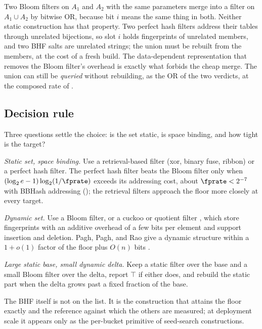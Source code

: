 \begin{remark}
\label{rem:bhf-nonmergeable}
Two Bloom filters on $A_1$ and $A_2$ with the same parameters merge into a
filter on $A_1 \cup A_2$ by bitwise OR, because bit $i$ means the same
thing in both. Neither static construction has that property. Two perfect
hash filters address their tables through unrelated bijections, so slot
$i$ holds fingerprints of unrelated members, and two BHF salts are
unrelated strings; the union must be rebuilt from the members, at the
cost of a fresh build. The data-dependent representation that removes
the Bloom filter's overhead is exactly what forbids the cheap merge. The
union can still be \emph{queried} without rebuilding, as the OR of the
two verdicts, at the composed rate of .
\end{remark}

\subsection*{Decision rule}

Three questions settle the choice: is the set static, is space binding,
and how tight is the target?

\smallskip
\noindent\emph{Static set, space binding.} Use a retrieval-based filter
(xor, binary fuse, ribbon) or a perfect hash filter. The perfect hash
filter beats the Bloom filter only when $(\log_2 e - 1) \log_2(1/\fprate)$
exceeds its addressing cost, about $\fprate < 2^{-7}$ with BBHash
addressing (); the retrieval filters approach the
floor more closely at every target.

\smallskip
\noindent\emph{Dynamic set.} Use a Bloom filter, or a cuckoo or quotient
filter \parencite{fan-cuckoo-2014,bender-quotient-2012}, which store
fingerprints with an additive overhead of a few bits per element and
support insertion and deletion. Pagh, Pagh, and Rao give a dynamic
structure within a $1 + o(1)$ factor of the floor plus $O(n)$ bits
\parencite{pagh-pagh-rao-2005}.

\smallskip
\noindent\emph{Large static base, small dynamic delta.} Keep a static
filter over the base and a small Bloom filter over the delta, report
$\top$ if either does, and rebuild the static part when the delta grows
past a fixed fraction of the base.

The BHF itself is not on the list. It is the construction that attains
the floor exactly and the reference against which the others are
measured; at deployment scale it appears only as the per-bucket
primitive of seed-search constructions.
